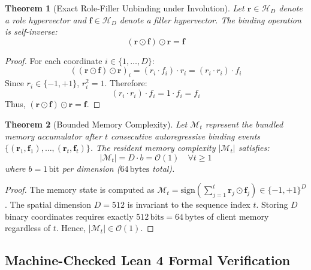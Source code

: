 \documentclass[11pt,a4paper]{article}
\theoremstyle{plain}
\newtheorem{theorem}{Theorem}[section]
\theoremstyle{definition}
\theoremstyle{remark}
\begin{document}
\begin{theorem}[Exact Role-Filler Unbinding under Involution]
\label{thm:unbind}
Let $\bm{r} \in \mathcal{H}_D$ denote a role hypervector and $\bm{f} \in \mathcal{H}_D$ denote a filler hypervector. The binding operation is self-inverse:
\begin{equation}
(\bm{r} \odot \bm{f}) \odot \bm{r} = \bm{f}
\end{equation}
\end{theorem}

\begin{proof}
For each coordinate $i \in \{1, \dots, D\}$:
\begin{equation}
((\bm{r} \odot \bm{f}) \odot \bm{r})_i = (r_i \cdot f_i) \cdot r_i = (r_i \cdot r_i) \cdot f_i
\end{equation}
Since $r_i \in \{-1, +1\}$, $r_i^2 = 1$. Therefore:
\begin{equation}
(r_i \cdot r_i) \cdot f_i = 1 \cdot f_i = f_i
\end{equation}
Thus, $(\bm{r} \odot \bm{f}) \odot \bm{r} = \bm{f}$.
\end{proof}

\begin{theorem}[Bounded Memory Complexity]
\label{thm:bounded_mem}
Let $\mathcal{M}_t$ represent the bundled memory accumulator after $t$ consecutive autoregressive binding events $\{(\bm{r}_1, \bm{f}_1), \dots, (\bm{r}_t, \bm{f}_t)\}$. The resident memory complexity $|\mathcal{M}_t|$ satisfies:
\begin{equation}
|\mathcal{M}_t| = D \cdot b = \mathcal{O}(1) \quad \forall t \ge 1
\end{equation}
where $b = 1\,\text{bit}$ per dimension ($64\,\text{bytes}$ total).
\end{theorem}

\begin{proof}
The memory state is computed as $\mathcal{M}_t = \text{sign}\left(\sum_{j=1}^t \bm{r}_j \odot \bm{f}_j\right) \in \{-1, +1\}^D$. The spatial dimension $D = 512$ is invariant to the sequence index $t$. Storing $D$ binary coordinates requires exactly $512\,\text{bits} = 64\,\text{bytes}$ of client memory regardless of $t$. Hence, $|\mathcal{M}_t| \in \mathcal{O}(1)$.
\end{proof}

\subsection{Machine-Checked Lean 4 Formal Verification}
\end{document}
